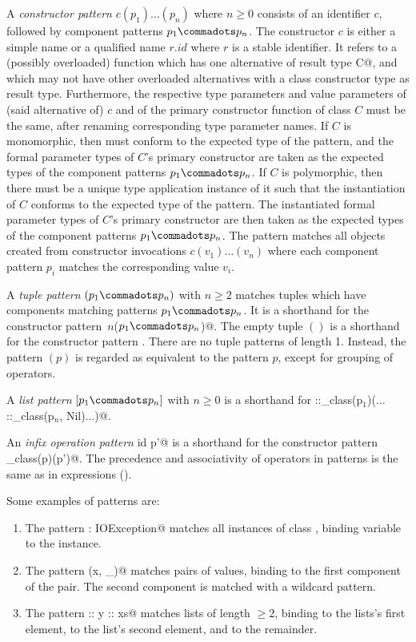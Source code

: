 \documentclass[11pt]{report}
\begin{document}
A {\em constructor pattern} $c(p_1) \ldots (p_n)$ where $n \geq 0$
consists of an identifier $c$, followed by component patterns $p_1
\commadots p_n$. The constructor $c$ is either a simple name
or a qualified name $r.id$ where $r$ is a stable identifier. It refers
to a (possibly overloaded) function which has one alternative of
result type \verb@class C@, and which may not have other overloaded
alternatives with a class constructor type as result type.
Furthermore, the respective type parameters and value parameters of
(said alternative of) $c$ and of the primary constructor function of
class $C$ must be the same, after renaming corresponding type parameter
names.  If $C$ is monomorphic, then
\verb@C@ must conform to the expected type of the pattern, and the
formal parameter types of $C$'s primary constructor are taken as the
expected types of the component patterns $p_1 \commadots p_n$.  If $C$
is polymorphic, then there must be a unique type application instance
of it such that the instantiation of $C$ conforms to the expected type
of the pattern. The instantiated formal parameter types of $C$'s
primary constructor are then taken as the expected types of the
component patterns $p_1\commadots p_n$.
The pattern matches all objects created from
constructor invocations $c(v_1)\ldots(v_n)$ where each component
pattern $p_i$ matches the corresponding value $v_i$.

A {\em tuple pattern} $(p_1 \commadots p_n)$ with $n \geq 2$ matches
tuples which have components matching patterns $p_1 \commadots p_n$.
It is a shorthand for the constructor pattern
\verb@Tuple$\,n$($p_1 \commadots p_n$)@.
The empty tuple $()$ is a shorthand for the
constructor pattern \verb@Unit@. There are no tuple patterns of length
1.  Instead, the pattern $(p)$ is regarded as equivalent to the
pattern $p$, except for grouping of operators.

A {\em list pattern} $[ p_1 \commadots p_n ]$ with $n \geq 0$
is a shorthand for \verb@::_class(p$_1$)(... ::_class(p$_n$, Nil)...)@.

An {\em infix operation pattern} \verb@p id p'@ is a shorthand for the
constructor pattern \verb@id_class(p)(p')@.  The precedence and
associativity of operators in patterns is the same as in expressions
().

\example Some examples of patterns are:
\begin{enumerate}
\item
The pattern \verb@ex: IOException@ matches all instances of class
\verb@IOException@, binding variable \verb@ex@ to the instance.
\item
The pattern \verb@(x, _)@ matches pairs of values, binding \verb@x@ to
the first component of the pair. The second component is matched
with a wildcard pattern.
\item
The pattern \verb@x :: y :: xs@ matches lists of length $\geq 2$,
binding \verb@x@ to the lists's first element, \verb@y@ to the list's
second element, and \verb@xs@ to the remainder.
\end{enumerate}
\end{document}
